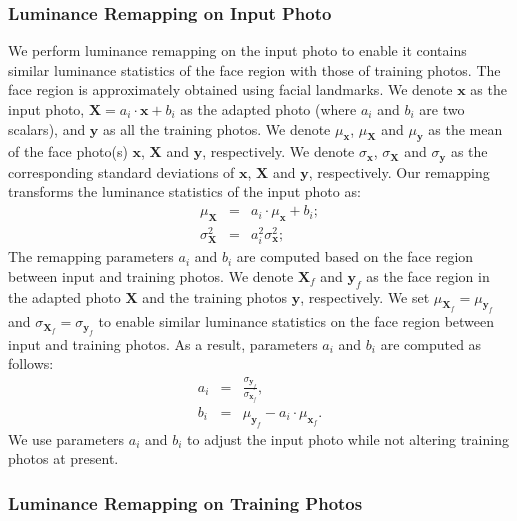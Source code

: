 \documentclass{article}
\def\y{\textbf{y}}
\def\X{\textbf{X}}
\def\x{\textbf{x}}
\begin{document}
\subsubsection{Luminance Remapping on Input Photo}\label{sec:lr_testing}

We perform luminance remapping on the input photo to enable it contains similar luminance statistics of the face region with those of training photos. The face region is approximately obtained using facial landmarks. We denote $\x$ as the input photo, $\X=a_i\cdot \x+b_i$ as the adapted photo (where $a_i$ and $b_i$ are two scalars), and $\y$ as all the training photos. We denote $\mu_{\x}$, $\mu_{\X}$ and $\mu_{\y}$ as the mean of the face photo(s) $\x$, $\X$ and $\y$, respectively. We denote $\sigma_{\x}$, $\sigma_{\X}$ and $\sigma_{\y}$ as the corresponding standard deviations of $\x$, $\X$ and $\y$, respectively. Our remapping transforms the luminance statistics of the input photo as:
\begin{eqnarray}
    \mu_{\X}&=&a_i\cdot \mu_{\x}+b_i;\\
    \sigma_{\X}^2&=&a_i^2\sigma_{\x}^2;
\end{eqnarray}
The remapping parameters $a_i$ and $b_i$ are computed based on the face region between input and training photos. We denote $\X_{f}$ and $\y_{f}$ as the face region in the adapted photo $\X$ and the training photos $\y$, respectively. We set $\mu_{\X_{f}}=\mu_{\y_{f}}$ and $\sigma_{\X_{f}}=\sigma_{\y_{f}}$ to enable similar luminance statistics on the face region between input and training photos. As a result, parameters $a_i$ and $b_i$ are computed as follows:
\begin{eqnarray}
    a_i&=&\frac{\sigma_{\y_{f}}}{\sigma_{\x_{f}}},\\
    b_i&=&\mu_{\y_{f}}-a_i\cdot\mu_{\x_{f}}.
\end{eqnarray}
We use parameters $a_i$ and $b_i$ to adjust the input photo while not altering training photos at present.

\subsubsection{Luminance Remapping on Training Photos}\label{sec:lr_training}
\end{document}
